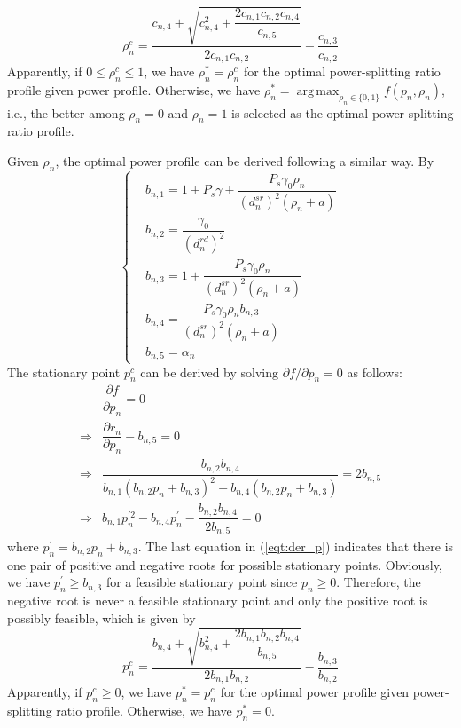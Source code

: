 \documentclass[12pt, draftclsnofoot, onecolumn]{IEEEtran}
\DeclareMathOperator*{\argmax}{arg\,max}
\begin{document}
\begin{equation}
\rho^{c}_{n}=\dfrac{c_{n,4}+\sqrt{c_{n,4}^{2}+\dfrac{2c_{n,1}c_{n,2}c_{n,4}}{c_{n,5}}}}{2c_{n,1}c_{n,2}}-\dfrac{c_{n,3}}{c_{n,2}}
\end{equation}
Apparently, if $0\leq\rho^{c}_{n}\leq 1$, we have $\rho^{*}_{n}=\rho^{c}_{n}$ for the optimal power-splitting ratio profile given power profile. Otherwise, we have $\rho^{*}_{n}=\mathop{\argmax}_{\rho_{n}\in\{0,1\}}f(p_{n},\rho_{n})$, i.e., the better among $\rho_{n}=0$ and $\rho_{n}=1$ is selected as the optimal power-splitting ratio profile.

Given $\rho_{n}$, the optimal power profile can be derived following a similar way. By 
\begin{equation}
\left\{
\begin{aligned}
&b_{n,1}=1+P_{s}\gamma+\dfrac{P_{s}\gamma_{0}\rho_{n}}{(d^{sr}_{n})^{2}(\rho_{n}+a)}\\
&b_{n,2}=\dfrac{\gamma_{0}}{(d^{rd}_{n})^{2}}\\
&b_{n,3}=1+\dfrac{P_{s}\gamma_{0}\rho_{n}}{(d^{sr}_{n})^{2}(\rho_{n}+a)}\\
&b_{n,4}=\dfrac{P_{s}\gamma_{0}\rho_{n}b_{n,3}}{(d^{sr}_{n})^{2}(\rho_{n}+a)}\\
&b_{n,5}=\alpha_{n}
\end{aligned}
\right.
\end{equation}
The stationary point $p^{c}_{n}$ can be derived by solving $\partial f/\partial p_{n}=0$ as follows:
\begin{equation}\label{eqt:der_p}
\begin{aligned}
&\dfrac{\partial f}{\partial p_{n}}=0\\
\Rightarrow &\dfrac{\partial r_{n}}{\partial p_{n}}-b_{n,5}=0\\
\Rightarrow &\dfrac{b_{n,2}b_{n,4}}{b_{n,1}(b_{n,2}p_{n}+b_{n,3})^{2}-b_{n,4}(b_{n,2}p_{n}+b_{n,3})}=2b_{n,5}\\
\Rightarrow &b_{n,1}p^{\prime 2}_{n}-b_{n,4}p^{\prime}_{n}-\dfrac{b_{n,2}b_{n,4}}{2b_{n,5}}=0
\end{aligned}
\end{equation}
where $p^{\prime}_{n}=b_{n,2}p_{n}+b_{n,3}$. The last equation in (\ref{eqt:der_p}) indicates that there is one pair of positive and negative roots for possible stationary points. Obviously, we have $p^{\prime}_{n}\geq b_{n,3}$ for a feasible stationary point since $p_{n}\geq 0$. Therefore, the negative root is never a feasible stationary point and only the positive root is possibly feasible, which is given by
\begin{equation}
p^{c}_{n}=\dfrac{b_{n,4}+\sqrt{b_{n,4}^{2}+\dfrac{2b_{n,1}b_{n,2}b_{n,4}}{b_{n,5}}}}{2b_{n,1}b_{n,2}}-\dfrac{b_{n,3}}{b_{n,2}}
\end{equation}
Apparently, if $p^{c}_{n}\geq 0$, we have $p^{*}_{n}=p^{c}_{n}$ for the optimal power profile given power-splitting ratio profile. Otherwise, we have $p^{*}_{n}=0$.
\end{document}
